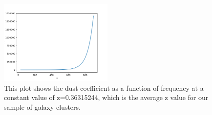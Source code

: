 \documentclass{princeton_astro_thesis}
\begin{document}
\begin{figure}[h]
\centering
\includegraphics[width=0.5\textwidth]{../bdust.png}
\caption{This plot shows the dust coefficient as a function of frequency at a constant value of z=0.36315244, which is the average z value for our sample of galaxy clusters.}
\end{figure}
\end{document}
